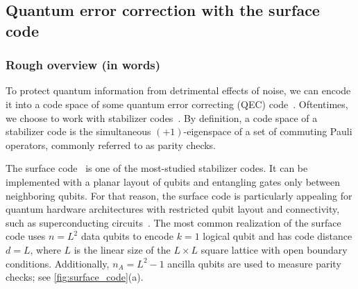 \begin{refsection}
\section{Quantum error correction with the surface code}
\label{prim:QEC}

\subsubsection*{Rough overview (in words)}


To protect quantum information from detrimental effects of noise, we can encode it into a code space of some quantum error correcting (QEC) code~\cite{shor1995SchemeReducingDecoherence,steane1996ErrorCorrectingQuantum}.
Oftentimes, we choose to work with stabilizer codes~\cite{gottesman1996QECCodesSaturatingHammingBound}.
By definition, a code space of a stabilizer code is the simultaneous $(+1)$-eigenspace of a set of commuting Pauli operators, commonly referred to as parity checks.


The surface code~\cite{kitaev1997FTQCanyons,bravyi1998quantumCodesLattice,dennis2002TopologicalQuantumMemory} is one of the most-studied stabilizer codes.
It can be implemented with a planar layout of qubits and entangling gates only between neighboring qubits.
For that reason, the surface code is particularly appealing for quantum hardware architectures with restricted qubit layout and connectivity, such as superconducting circuits~\cite{devoret2013superconductingCircuits,blais2021circuitQuantumElectrodynamics}.
The most common realization of the surface code uses $n = L^2$ data qubits to encode $k=1$ logical qubit and has code distance $d=L$, where $L$ is the linear size of the $L\times L$ square lattice with open boundary conditions.
Additionally, $n_A = L^2 -1$ ancilla qubits are used to measure parity checks; see \cref{fig:surface_code}(a).



\end{refsection}
